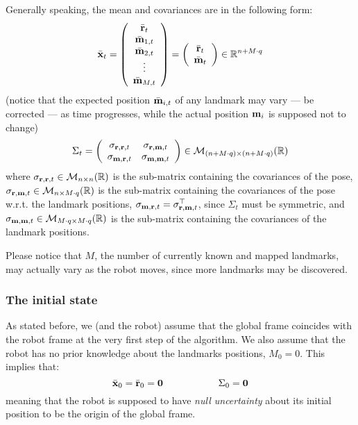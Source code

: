 	Generally speaking, the mean and covariances are in the following form:
	\[
		\bar{\boldsymbol{\mathrm{{x}}}}_t =
		\left(\begin{array}{c}
			\bar{\boldsymbol{\mathrm{{r}}}}_t \\ \bar{\boldsymbol{\mathrm{{m}}}}_{1,t} \\ \bar{\boldsymbol{\mathrm{{m}}}}_{2,t} \\ \vdots \\ \bar{\boldsymbol{\mathrm{{m}}}}_{M,t}
		\end{array}\right)
		=
		\left(\begin{array}{c}
			\bar{\boldsymbol{\mathrm{{r}}}}_t \\ \bar{\boldsymbol{\mathrm{{m}}}}_t
		\end{array}\right)
		\in \mathbb{R}^{n + M \cdot q}
	\]
	(notice that the expected position $\bar{\boldsymbol{\mathrm{{m}}}}_{i,t}$ of any landmark may vary --- \ie{} be corrected --- as time progresses, while the actual position $\boldsymbol{\mathrm{{m}}}_{i}$ is supposed not to change)
	\[
		\Sigma_t =
		\left(\begin{array}{cc}
			\sigma_{\boldsymbol{\mathrm{{r}}},\boldsymbol{\mathrm{{r}}}, t} & \sigma_{\boldsymbol{\mathrm{{r}}},\boldsymbol{\mathrm{{m}}}, t} \\
			\sigma_{\boldsymbol{\mathrm{{m}}},\boldsymbol{\mathrm{{r}}}, t} & \sigma_{\boldsymbol{\mathrm{{m}}},\boldsymbol{\mathrm{{m}}}, t}
		\end{array}\right)
		\in \mathcal{M}_{(n + M \cdot q) \times (n + M \cdot q)}(\mathbb{R})
	\]
	where $\sigma_{\boldsymbol{\mathrm{{r}}},\boldsymbol{\mathrm{{r}}}, t} \in \mathcal{M}_{n \times n}(\mathbb{R})$ is the sub-matrix containing the covariances of the pose, $\sigma_{\boldsymbol{\mathrm{{r}}},\boldsymbol{\mathrm{{m}}}, t} \in \mathcal{M}_{n \times M \cdot q}(\mathbb{R})$ is the sub-matrix containing the covariances of the pose w.r.t. the landmark positions,  $\sigma_{\boldsymbol{\mathrm{{m}}},\boldsymbol{\mathrm{{r}}}, t} = \sigma^\top_{\boldsymbol{\mathrm{{r}}},\boldsymbol{\mathrm{{m}}}, t}$, since $\Sigma_t$ must be symmetric, and $\sigma_{\boldsymbol{\mathrm{{m}}},\boldsymbol{\mathrm{{m}}}, t} \in \mathcal{M}_{M \cdot q \times M \cdot q}(\mathbb{R})$ is the sub-matrix containing the covariances of the landmark positions.
	
	Please notice that $M$, \ie{} the number of currently known and mapped landmarks, may actually vary as the robot moves, since more landmarks may be discovered.
	
	\subsubsection{The initial state}
	
		As stated before, we (and the robot) assume that the global frame coincides with the robot frame at the very first step of the \SLAM{} algorithm. We also assume that the robot has no prior knowledge about the landmarks positions, \ie{} $M_0 = 0$.
		This implies that:
		\[
			\bar{\boldsymbol{\mathrm{{x}}}}_0 = \bar{\boldsymbol{\mathrm{{r}}}}_0 = \boldsymbol{\mathrm{{0}}}
			\hspace{2cm}
			\Sigma_0 = \boldsymbol{\mathrm{{0}}}
		\]
		meaning that the robot is supposed to have \emph{null uncertainty} about its initial position to be the origin of the global frame.
		
